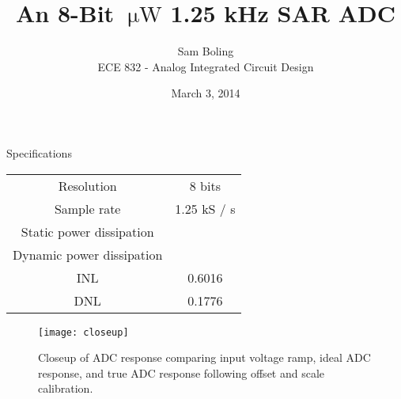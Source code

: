 \documentclass{beamer}
\title{An 8-Bit $~\mathrm{\mu W}$ 1.25 kHz SAR ADC} %
\author{Sam Boling\\
        ECE 832 - Analog Integrated Circuit Design}
\date{March 3, 2014}
\begin{document}
\begin{frame}
\titlepage
\end{frame}

\begin{frame}{Specifications}
  \begin{center}
  \begin{tabular}{c c}
    Resolution                & 8 bits\\
    Sample rate               & 1.25 kS / s \\
    Static power dissipation  & \\
    Dynamic power dissipation & \\
    INL                       & 0.6016 \\
    DNL                       & 0.1776 \\
  \end{tabular}
  \end{center}
\end{frame}




\begin{frame}
  \begin{figure}
    \texttt{[image: closeup]}
    \caption{Closeup of ADC response comparing input voltage ramp,
             ideal ADC response, and true ADC response following
             offset and scale calibration.}
  \end{figure}
\end{frame}

%  
%  
\end{document}

